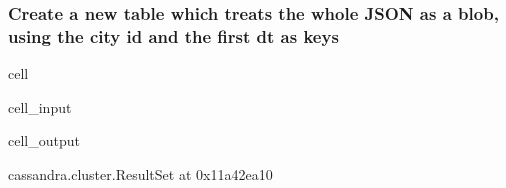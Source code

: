 \documentclass[letterpaper,10pt,english]{jupyterBook}
\begin{document}
\subsubsection{Create a new table which treats the whole JSON as a blob, using the city id and the first dt as keys}
\label{\detokenize{2_Data_sources/Databases/Cassandra:create-a-new-table-which-treats-the-whole-json-as-a-blob-using-the-city-id-and-the-first-dt-as-keys}}
\begin{sphinxuseclass}{cell}\begin{sphinxVerbatimInput}

\begin{sphinxuseclass}{cell_input}
\begin{sphinxVerbatim}[commandchars=\\\{\}]
\end{sphinxVerbatim}

\end{sphinxuseclass}\end{sphinxVerbatimInput}
\begin{sphinxVerbatimOutput}

\begin{sphinxuseclass}{cell_output}
\begin{sphinxVerbatim}[commandchars=\\\{\}]
\PYGZlt{}cassandra.cluster.ResultSet at 0x11a42ea10\PYGZgt{}
\end{sphinxVerbatim}

\end{sphinxuseclass}\end{sphinxVerbatimOutput}

\end{sphinxuseclass}
\end{document}
